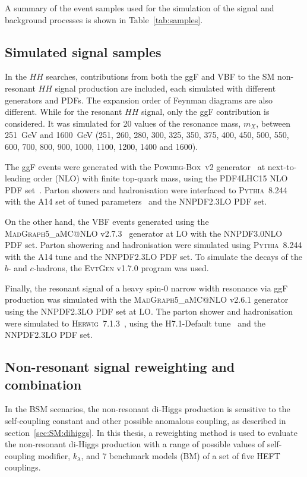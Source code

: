 A summary of the event samples used for the simulation of the signal and background
processes is shown in Table~\ref{tab:samples}.
\begin{landscape}
\end{landscape}
\subsection{Simulated signal samples}

In the $HH$ searches, contributions from both the ggF and VBF to the 
SM non-resonant $HH$ signal production are included, 
each simulated with different generators and PDFs.
The expansion order of Feynman diagrams are also different. 
While for the resonant $HH$ signal, only the ggF contribution 
is considered.
It was simulated for 20 values of the resonance mass, $m_{X}$,
between 251~GeV and 1600~GeV
(251, 260, 280, 300, 325, 350, 375,
 400, 450, 500, 550, 600, 700, 800, 
 900, 1000, 1100, 1200, 1400 and 1600).

The ggF events were generated with 
the \textsc{Powheg-Box~v2} generator~\cite{Alioli:2010xd}
at next-to-leading order (NLO) with finite top-quark mass,
using the \textsc{PDF4LHC15} NLO PDF set~\cite{Butterworth:2015oua}.
Parton showers and hadronisation were interfaced to 
\textsc{Pythia~8.244}~\cite{Sjostrand:2007gs}
with the A14 set of tuned parameters~\cite{ATL-PHYS-PUB-2014-021,ATLAS:2012uec} 
and the \textsc{NNPDF2.3LO} PDF set.


On the other hand, the VBF events generated using the
\textsc{MadGraph}5\_aMC@NLO v2.7.3~\cite{Alwall:2014hca} generator at LO 
with the \textsc{NNPDF3.0NLO}~\cite{Ball:2014uwa} PDF set.
Parton showering and hadronisation were simulated using \textsc{Pythia~8.244}
with the A14 tune and the \textsc{NNPDF2.3LO} PDF set.
To simulate the decays of the $b$- and $c$-hadrons,
the \textsc{EvtGen} v1.7.0 program was used.

Finally, the resonant signal  
of a heavy spin-0 narrow width resonance via ggF production 
was simulated with the \textsc{MadGraph}5\_aMC@NLO v2.6.1 
generator using the \textsc{NNPDF2.3LO} PDF
set at LO.
The parton shower and hadronisation were simulated to
\textsc{Herwig~7.1.3}~\cite{Bahr:2008pv,Bellm:2015jjp},
using the H7.1-Default tune~\cite{Gieseke:2012ft}
and the \textsc{NNPDF2.3LO} PDF set.


\subsection{Non-resonant signal reweighting and combination}
\label{sec:DiHiggs:klscan}
In the BSM scenarios, the non-resonant di-Higgs production is sensitive 
to the self-coupling constant and other possible anomalous coupling,
as described in section~\ref{sec:SM:dihiggs}.
In this thesis, a reweighting method is used to evaluate
the non-resonant di-Higgs production with a range of possible 
values of self-coupling modifier, $k_\lambda$, and 7 benchmark models (BM)
of a set of five HEFT couplings. 
